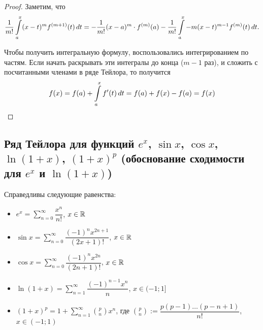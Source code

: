 \documentclass[a4paper]{article}
\theoremstyle{named}
\renewcommand{\int}{\intop}
\begin{document}
    	\begin{proof}
    		Заметим, что
    		\begin{equation*}
    			\dfrac{1}{m!} \int_a^x (x - t)^m f^{(m + 1)}(t) \dd t
    			= -\dfrac{1}{m!}(x - a)^m \cdot f^{(m)}(a) - \dfrac{1}{m!} \int_a^x -m(x - t)^{m - 1}f^{(m)}(t) \dd t.
    		\end{equation*}

    		Чтобы получить интегральную формулу, воспользовались интегрированием по частям. Если начать раскрывать эти интегралы до конца ($m - 1$ раз), и сложить с посчитанными членами в ряде Тейлора, то получится
    		\begin{equation*}
    			f(x) = f(a) + \int_a^x f'(t) \dd t = f(a) + f(x) - f(a) = f(x)
    		\end{equation*}
    	\end{proof}

    	\subsection{Ряд Тейлора для функций $e^x$, $\sin x$, $\cos x$, $\ln(1 + x)$, $(1 + x)^p$ (обоснование сходимости для $e^x$ и $\ln(1 + x)$)}

    	\begin{consequence*}
    		Справедливы следующие равенства:

    		\begin{itemize}
    		\item
    			$e^x = \sum_{n = 0}^{\infty} \dfrac{x^n}{n!}$, $x \in \mathbb{R}$

    		\item
    			$\sin x = \sum_{n = 0}^{\infty} \dfrac{(-1)^n x^{2n + 1}}{(2x + 1)!}$, $x \in \mathbb{R}$

    		\item
    			$\cos x = \sum_{n = 0}^{\infty} \dfrac{(-1)^n x^{2n}}{(2n + 1)!}$, $x \in \mathbb{R}$

    		\item
    			$\ln(1 + x) = \sum_{n = 1}^{\infty} \dfrac{(-1)^{n - 1}x^n}{n}$, $x \in (-1; 1]$

    		\item
    			$(1 + x)^p = 1 + \sum_{n = 1}^{\infty} \binom{p}{n} x^n$, где $\binom{p}{n} := \dfrac{p(p - 1) \dots (p - n + 1)}{n!}$, $x \in (-1; 1)$
    		\end{itemize}
    	\end{consequence*}
\end{document}
